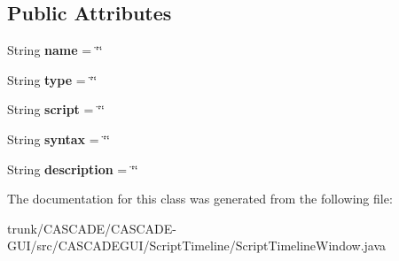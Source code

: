 \subsection*{Public Attributes}
\begin{DoxyCompactItemize}
\item 
\hypertarget{classCASCADEGUI_1_1ScriptTimeline_1_1ScriptTimelineWindow_1_1Command_a6ab55b8cbe6770953255018a19a4828d}{String {\bfseries name} = \char`\"{}\char`\"{}}\label{classCASCADEGUI_1_1ScriptTimeline_1_1ScriptTimelineWindow_1_1Command_a6ab55b8cbe6770953255018a19a4828d}

\item 
\hypertarget{classCASCADEGUI_1_1ScriptTimeline_1_1ScriptTimelineWindow_1_1Command_a2dc10b2b22685dfa81e7e699155602b4}{String {\bfseries type} = \char`\"{}\char`\"{}}\label{classCASCADEGUI_1_1ScriptTimeline_1_1ScriptTimelineWindow_1_1Command_a2dc10b2b22685dfa81e7e699155602b4}

\item 
\hypertarget{classCASCADEGUI_1_1ScriptTimeline_1_1ScriptTimelineWindow_1_1Command_abf3fe2bd848170c00385faa6751a2f73}{String {\bfseries script} = \char`\"{}\char`\"{}}\label{classCASCADEGUI_1_1ScriptTimeline_1_1ScriptTimelineWindow_1_1Command_abf3fe2bd848170c00385faa6751a2f73}

\item 
\hypertarget{classCASCADEGUI_1_1ScriptTimeline_1_1ScriptTimelineWindow_1_1Command_a28290b48c4a5f8dd183f44d6583ca5eb}{String {\bfseries syntax} = \char`\"{}\char`\"{}}\label{classCASCADEGUI_1_1ScriptTimeline_1_1ScriptTimelineWindow_1_1Command_a28290b48c4a5f8dd183f44d6583ca5eb}

\item 
\hypertarget{classCASCADEGUI_1_1ScriptTimeline_1_1ScriptTimelineWindow_1_1Command_a9d2c13fdcd351c8253c04a3b456bef2b}{String {\bfseries description} = \char`\"{}\char`\"{}}\label{classCASCADEGUI_1_1ScriptTimeline_1_1ScriptTimelineWindow_1_1Command_a9d2c13fdcd351c8253c04a3b456bef2b}

\end{DoxyCompactItemize}


The documentation for this class was generated from the following file\-:\begin{DoxyCompactItemize}
\item 
trunk/\-C\-A\-S\-C\-A\-D\-E/\-C\-A\-S\-C\-A\-D\-E-\/\-G\-U\-I/src/\-C\-A\-S\-C\-A\-D\-E\-G\-U\-I/\-Script\-Timeline/Script\-Timeline\-Window.\-java\end{DoxyCompactItemize}
